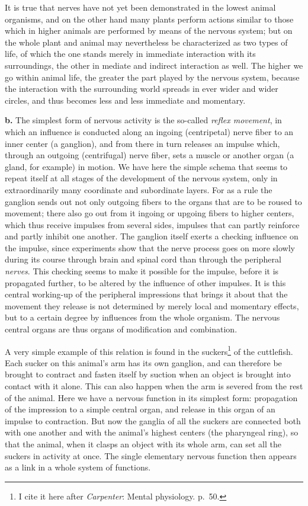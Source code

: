 \documentclass[12pt,a4paper]{book}
\newcommand{\opage}[1]{\marginnote{\footnotesize\textit{[#1]}}}
\begin{document}
It is true that nerves have not yet been demonstrated in the lowest
animal organisms, and on the other hand many plants perform actions
similar to those which in higher animals are performed by means of the
nervous system; but on the whole plant and animal may nevertheless be
characterized as two types of life, of which the one stands merely in
immediate interaction with its surroundings, the other in mediate and
indirect interaction as well. The higher we go within animal life, the
greater the part played by the nervous system, because the interaction
with the surrounding world spreads in ever wider and wider circles, and
thus becomes less and less immediate and momentary.

\textbf{b.} The simplest form of nervous activity is the so-called
\emph{reflex movement}, in which an influence is conducted along an
ingoing (centripetal) nerve fiber to an inner center (a ganglion), and
from there in turn releases an impulse which, through an outgoing
(centrifugal) nerve fiber, sets a muscle or another organ (a gland, for
example) in motion. We have here the simple schema that seems to repeat
itself at all stages of the development of the nervous system, only in
extraordinarily many coordinate and subordinate layers. For as a rule
the ganglion sends out not only outgoing fibers to the organs that are
to be roused to movement; there also go out from it ingoing or upgoing
fibers to higher centers, which thus receive impulses from several
sides, impulses that can partly reinforce and partly inhibit one
another. The ganglion itself exerts a checking influence on
\opage{46}the impulse, since experiments show that the nerve process
goes on more slowly during its course through brain and spinal cord than
through the peripheral \emph{nerves}. This checking seems to make it
possible for the impulse, before it is propagated further, to be altered
by the influence of other impulses. It is this central working-up of the
peripheral impressions that brings it about that the movement they
release is not determined by merely local and momentary effects, but to
a certain degree by influences from the whole organism. The nervous
central organs are thus organs of modification and combination.

A very simple example of this relation is found in the
suckers\footnote{I cite it here after \emph{Carpenter}: Mental
physiology. p.~50.} of the cuttlefish. Each sucker on this animal's arm
has its own ganglion, and can therefore be brought to contract and
fasten itself by suction when an object is brought into contact with it
alone. This can also happen when the arm is severed from the rest of
the animal. Here we have a nervous function in its simplest form:
propagation of the impression to a simple central organ, and release in
this organ of an impulse to contraction. But now the ganglia of all the
suckers are connected both with one another and with the animal's
highest centers (the pharyngeal ring), so that the animal, when it
clasps an object with its whole arm, can set all the suckers in activity
at once. The single elementary nervous function then appears as a link
in a whole system of functions.
\end{document}
